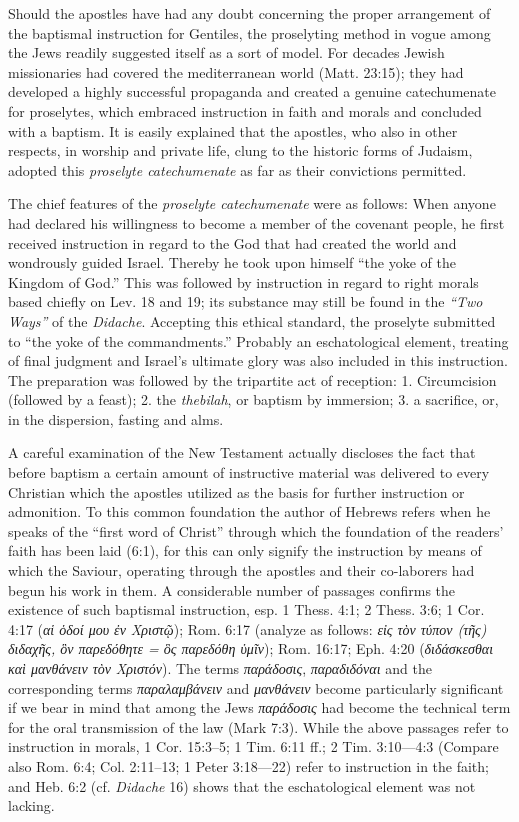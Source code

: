 Should the apostles have had any doubt concerning the proper arrangement of the baptismal instruction for Gentiles, the proselyting method in vogue among the Jews readily suggested itself as a sort of model. For decades Jewish missionaries had covered the mediterranean world (Matt. 23:15); they had developed a highly successful propaganda and created a genuine catechumenate for proselytes, which embraced instruction in faith and morals and concluded with a baptism. It is easily explained that the apostles, who also in other respects, in worship and private life, clung to the historic forms of Judaism, adopted this \emph{proselyte catechumenate} as far as their convictions permitted.

The chief features of the \emph{proselyte catechumenate} were as follows: When anyone had declared his willingness to become a member of the covenant people, he first received instruction in regard to the God that had created the world and wondrously guided Israel. Thereby he took upon himself “the yoke of the Kingdom of God.” This was followed by instruction in regard to right morals based chiefly on Lev. 18 and 19; its substance may still be found in the \emph{“Two Ways”} of the \emph{Didache}. Accepting this ethical standard, the proselyte submitted to “the yoke of the commandments.” Probably an eschatological element, treating of final judgment and Israel’s ultimate glory was also included in this instruction. The preparation was followed
by the tripartite act of reception: 1. Circumcision (followed by a feast); 2. the \emph{thebilah}, or baptism by immersion; 3. a sacrifice, or, in the dispersion, fasting and alms.

A careful examination of the New Testament actually discloses the fact that before baptism a certain amount of instructive material was delivered to every Christian which the apostles utilized as the basis for further instruction or admonition. To this common foundation the author of Hebrews refers when he speaks of the “first word of Christ” through which the foundation of the readers’ faith has been laid (6:1), for this can only signify the instruction by means of which the Saviour, operating through the apostles and their co-laborers had begun his work in them. A considerable number of passages confirms the existence of such baptismal instruction, esp. 1 Thess. 4:1; 2 Thess. 3:6; 1 Cor. 4:17 (\emph{αἱ ὁδοί μου ἐν Χριστῷ}); Rom. 6:17 (analyze as follows: \emph{εἰς τὸν τύπον (τῆς) διδαχῆς, ὃν παρεδόθητε = ὃς παρεδόθη ὑμῖν}); Rom. 16:17; Eph. 4:20 (\emph{διδάσκεσθαι καὶ μανθάνειν τὸν Χριστόν}). The terms \emph{παράδοσις}, \emph{παραδιδόναι} and the corresponding terms \emph{παραλαμβάνειν} and \emph{μανθάνειν} become particularly significant if we bear in mind that among the Jews \emph{παράδοσις} had become the technical term for the oral transmission of the law (Mark 7:3). While the above passages refer to instruction in morals, 1 Cor. 15:3–5; 1 Tim. 6:11 ff.; 2 Tim. 3:10—4:3 (Compare also Rom. 6:4; Col. 2:11–13; 1 Peter 3:18—22) refer to instruction in the faith; and Heb. 6:2 (cf. \emph{Didache} 16) shows that the eschatological element was not lacking.

